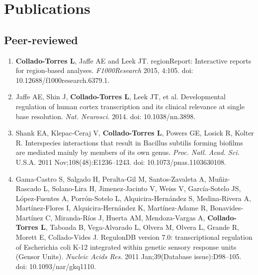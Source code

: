 \section{Publications}
\subsection{Peer-reviewed}
    \begin{enumerate}
        \item \textbf{Collado-Torres L}, Jaffe AE and Leek JT. regionReport: Interactive reports for region-based analyses. \emph{F1000Research} 2015, 4:105. doi: 10.12688/f1000research.6379.1.
        \item Jaffe AE, Shin J, \textbf{Collado-Torres L}, Leek JT, et al. Developmental regulation of human cortex transcription and its clinical relevance at single base resolution. \emph{Nat. Neurosci.} 2014. doi: 10.1038/nn.3898.
        \item Shank EA, Klepac-Ceraj V, \textbf{Collado-Torres L}, Powers GE, Losick R, Kolter R. Interspecies interactions that result in Bacillus subtilis forming biofilms are mediated mainly by members of its own genus. \emph{Proc. Natl. Acad. Sci.} U.S.A. 2011 Nov;108(48):E1236–1243. doi: 10.1073/pnas.1103630108.
        \item Gama-Castro S, Salgado H, Peralta-Gil M, Santos-Zavaleta A, Muñiz-Rascado L, Solano-Lira H, Jimenez-Jacinto V, Weiss V, Garc\'ia-Sotelo JS, L\'opez-Fuentes A, Porr\'on-Sotelo L, Alquicira-Hern\'andez S, Medina-Rivera A, Mart\'inez-Flores I, Alquicira-Hern\'andez K, Mart\'inez-Adame R, Bonavides-Mart\'inez C, Miranda-R\'ios J, Huerta AM, Mendoza-Vargas A, \textbf{Collado-Torres L}, Taboada B, Vega-Alvarado L, Olvera M, Olvera L, Grande R, Morett E, Collado-Vides J. RegulonDB version 7.0: transcriptional regulation of Escherichia coli K-12 integrated within genetic sensory response units (Gensor Units). \emph{Nucleic Acids Res.} 2011 Jan;39(Database issue):D98–105. doi: 10.1093/nar/gkq1110.
    \end{enumerate}
